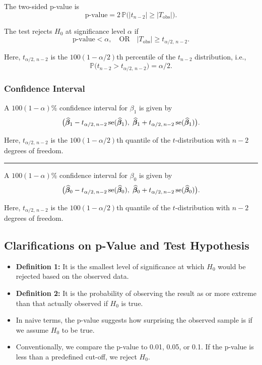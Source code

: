 The two-sided p-value is
\[
\text{p-value}
=
2 \, \mathbb{P}
\bigl(
|t_{n-2}| \ge |T_{\text{obs}}|
\bigr).
\]

The test rejects $H_0$ at significance level $\alpha$ if
\[
\text{p-value} < \alpha,
\quad \text{OR} \quad
|T_{\text{obs}}| \ge t_{\alpha/2,\,n-2}.
\]

Here, $t_{\alpha/2,\,n-2}$ is the $100(1-\alpha/2)$th percentile of the $t_{n-2}$ distribution, i.e.,
\[
\mathbb{P}\bigl(t_{n-2} > t_{\alpha/2,\,n-2}\bigr) = \alpha/2.
\]

\subsubsection{Confidence Interval}

A $100(1-\alpha)\%$ confidence interval for $\beta_1$ is given by
\[
\bigl(
\widehat{\boldsymbol{\beta}}_1 - t_{\alpha/2,\,n-2}\,\mathrm{se}(\widehat{\boldsymbol{\beta}}_1),
\;
\widehat{\boldsymbol{\beta}}_1 + t_{\alpha/2,\,n-2}\,\mathrm{se}(\widehat{\boldsymbol{\beta}}_1)
\bigr).
\]

Here, $t_{\alpha/2,\,n-2}$ is the $100(1-\alpha/2)$th quantile of the $t$-distribution with $n-2$ degrees of freedom.

\vspace{0.5em}
\hrule
\vspace{0.5em}

A $100(1-\alpha)\%$ confidence interval for $\beta_0$ is given by
\[
\bigl(
\widehat{\boldsymbol{\beta}}_0 - t_{\alpha/2,\,n-2}\,\mathrm{se}(\widehat{\boldsymbol{\beta}}_0),
\;
\widehat{\boldsymbol{\beta}}_0 + t_{\alpha/2,\,n-2}\,\mathrm{se}(\widehat{\boldsymbol{\beta}}_0)
\bigr).
\]

Here, $t_{\alpha/2,\,n-2}$ is the $100(1-\alpha/2)$th quantile of the $t$-distribution with $n-2$ degrees of freedom.

\subsection{Clarifications on p-Value and Test Hypothesis}

\begin{itemize}
\item \textbf{Definition 1:} It is the smallest level of significance at which $H_0$ would be rejected based on the observed data.
\item \textbf{Definition 2:} It is the probability of observing the result as or more extreme than that actually observed if $H_0$ is true.
\item In naive terms, the p-value suggests how surprising the observed sample is if we assume $H_0$ to be true.
\item Conventionally, we compare the p-value to 0.01, 0.05, or 0.1. If the p-value is less than a predefined cut-off, we reject $H_0$.
\end{itemize}

